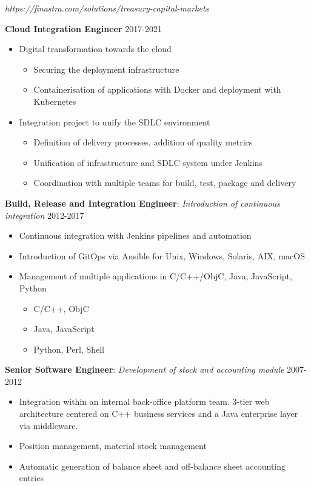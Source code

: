 \documentclass[11pt,a4paper]{moderncv}
\begin{document}
{
\textit{https://finastra.com/solutions/treasury-capital-markets}
\bigskip

\textbf{Cloud Integration Engineer} \hfill 2017-2021
\bigskip
	\begin{itemize}%
		\item Digital transformation towards the cloud
			\begin{itemize}%
				\item Securing the deployment infrastructure
				\item Containerisation of applications with Docker and deployment with Kubernetes
			\end{itemize}
	\end{itemize}
\bigskip
	\begin{itemize}%
	\item	Integration project to unify the SDLC environment
		\begin{itemize}%
				\item Definition of delivery processes, addition of quality metrics
				\item Unification of infrastructure and SDLC system under Jenkins
				\item Coordination with multiple teams for build, test, package and delivery
		\end{itemize}
	\end{itemize}
\bigskip
 \textbf{Build, Release and Integration Engineer}: \textit{Introduction of continuous integration} \hfill 2012-2017
\bigskip
			\begin{itemize}%
				\item Continuous integration with Jenkins pipelines and automation
                \item Introduction of GitOps via Ansible for Unix, Windows, Solaris, AIX, macOS
				\item Management of multiple applications in C/C++/ObjC, Java, JavaScript, Python
					\begin{itemize}
						\item C/C++, ObjC
						\item Java, JavaScript
						\item Python, Perl, Shell
					\end{itemize}
				\end{itemize}
\bigskip
\textbf{Senior Software Engineer}: \textit{Development of stock and accounting module} \hfill 2007-2012

\bigskip
			\begin{itemize}
				\item Integration within an internal back-office platform team. 3-tier web architecture centered on C++ business services and a Java enterprise layer via middleware.
				\item Position management, material stock management
				\item Automatic generation of balance sheet and off-balance sheet accounting entries
			\end{itemize}
}
\end{document}
